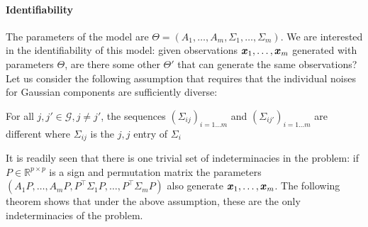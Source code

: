 \paragraph{Identifiability} The parameters of the model are $\Theta = (A_1, \dots, A_m, \Sigma_1, \dots, \Sigma_m)$. We are interested in the identifiability of this model: given observations $\boldsymbol{x}_1,\dots, \boldsymbol{x}_m$ generated with parameters $\Theta$, are there some other $\Theta'$ that can generate the same observations?
Let us consider the following assumption that requires that the individual noises for Gaussian components are sufficiently diverse:
%
\begin{assumption}
\label{ass:diversity}
For all $j, j' \in \mathcal{G}, j \neq j'$, the sequences $(\Sigma_{ij})_{i=1 \dots m}$ and $(\Sigma_{ij'})_{i=1 \dots m}$ are different where $\Sigma_{ij}$ is the $j, j$ entry of $\Sigma_i$
\end{assumption}

It is readily seen that there is one trivial set of indeterminacies in the problem: if $P \in \mathbb{R}^{p \times p}$ is a sign and permutation matrix the parameters $(A_1 P, \dots, A_m P, P^{\top}\Sigma_1 P, \dots, P^{\top} \Sigma_m P)$ also generate $\boldsymbol{x}_1,\dots, \boldsymbol{x}_m$. The following theorem shows that under the above assumption, these are the only indeterminacies of the problem.

